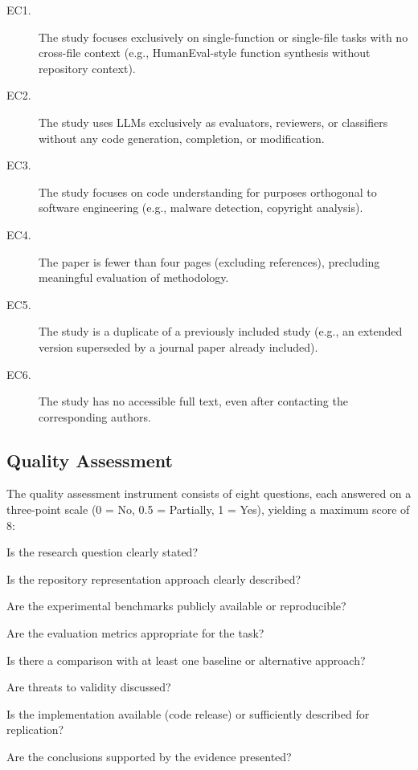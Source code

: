 \begin{description}
  \item[EC1.] The study focuses exclusively on single-function or single-file tasks with no
    cross-file context (e.g., HumanEval-style function synthesis without repository context).
  \item[EC2.] The study uses LLMs exclusively as evaluators, reviewers, or classifiers
    without any code generation, completion, or modification.
  \item[EC3.] The study focuses on code understanding for purposes orthogonal to software
    engineering (e.g., malware detection, copyright analysis).
  \item[EC4.] The paper is fewer than four pages (excluding references), precluding
    meaningful evaluation of methodology.
  \item[EC5.] The study is a duplicate of a previously included study (e.g., an extended
    version superseded by a journal paper already included).
  \item[EC6.] The study has no accessible full text, even after contacting the corresponding
    authors.
\end{description}

\subsection{Quality Assessment}
\label{subsec:quality}

The quality assessment instrument consists of eight questions, each answered on a three-point
scale (0 = No, 0.5 = Partially, 1 = Yes), yielding a maximum score of 8:

\begin{description}[leftmargin=2.5em, labelwidth=2.5em]
  \item[\textbf{QA1.}] Is the research question clearly stated?
  \item[\textbf{QA2.}] Is the repository representation approach clearly described?
  \item[\textbf{QA3.}] Are the experimental benchmarks publicly available or reproducible?
  \item[\textbf{QA4.}] Are the evaluation metrics appropriate for the task?
  \item[\textbf{QA5.}] Is there a comparison with at least one baseline or alternative approach?
  \item[\textbf{QA6.}] Are threats to validity discussed?
  \item[\textbf{QA7.}] Is the implementation available (code release) or sufficiently described
    for replication?
  \item[\textbf{QA8.}] Are the conclusions supported by the evidence presented?
\end{description}

